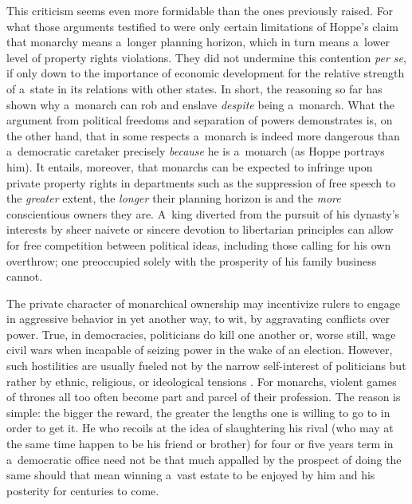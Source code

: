 This criticism seems even more formidable than the ones previously raised. For what those arguments testified to were only certain limitations of Hoppe's claim that monarchy means a~longer planning horizon, which in turn means a~lower level of property rights violations. They did not undermine this contention \textit{per se}, if only down to the importance of economic development for the relative strength of a~state in its relations with other states. In short, the reasoning so far has shown why a~monarch can rob and enslave \textit{despite} being a~monarch. What the argument from political freedoms and separation of powers demonstrates is, on the other hand, that in some respects a~monarch is indeed more dangerous than a~democratic caretaker precisely \textit{because} he is a~monarch (as Hoppe portrays him). It entails, moreover, that monarchs can be expected to infringe upon private property rights in departments such as the suppression of free speech to the \textit{greater} extent, the \textit{longer} their planning horizon is and the \textit{more} conscientious owners they are. A~king diverted from the pursuit of his dynasty's interests by sheer naivete or sincere devotion to libertarian principles can allow for free competition between political ideas, including those calling for his own overthrow; one preoccupied solely with the prosperity of his family business cannot.



The private character of monarchical ownership may incentivize rulers to engage in aggressive behavior in yet another way, to wit, by aggravating conflicts over power. True, in democracies, politicians do kill one another or, worse still, wage civil wars when incapable of seizing power in the wake of an election. However, such hostilities are usually fueled not by the narrow self-interest of politicians but rather by ethnic, religious, or ideological tensions 
\parencite[][]{megger_krytyczna_2018}. %
 For monarchs, violent games of thrones all too often become part and parcel of their profession. The reason is simple: the bigger the reward, the greater the lengths one is willing to go to in order to get it. He who recoils at the idea of slaughtering his rival (who may at the same time happen to be his friend or brother) for four or five years term in a~democratic office need not be that much appalled by the prospect of doing the same should that mean winning a~vast estate to be enjoyed by him and his posterity for centuries to come.



